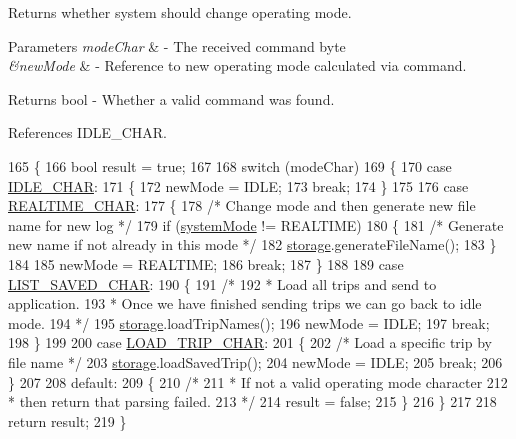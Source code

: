 Returns whether system should change operating mode. 


\begin{DoxyParams}{Parameters}
{\em mode\+Char} & -\/ The received command byte \\
\hline
{\em \&new\+Mode} & -\/ Reference to new operating mode calculated via command. \\
\hline
\end{DoxyParams}
\begin{DoxyReturn}{Returns}
bool -\/ Whether a valid command was found. 
\end{DoxyReturn}


References I\+D\+L\+E\+\_\+\+C\+H\+AR.


\begin{DoxyCode}
165 \{
166   \textcolor{keywordtype}{bool} result = \textcolor{keyword}{true};
167 
168   \textcolor{keywordflow}{switch} (modeChar)
169   \{
170     \textcolor{keywordflow}{case} \hyperlink{logging-device_8ino_ad7f0721d7856c100a69be7fa82e2865b}{IDLE\_CHAR}:
171     \{
172       newMode = IDLE;
173       \textcolor{keywordflow}{break};
174     \}
175 
176     \textcolor{keywordflow}{case} \hyperlink{logging-device_8ino_a911a5839eebf5e3d5927f4f77e9bfb62}{REALTIME\_CHAR}:
177     \{
178       \textcolor{comment}{/* Change mode and then generate new file name for new log */}
179       \textcolor{keywordflow}{if} (\hyperlink{logging-device_8ino_a13a2ecbcf455940dd240e54e9e39cf7a}{systemMode} != REALTIME)
180       \{
181         \textcolor{comment}{/* Generate new name if not already in this mode */}
182         \hyperlink{logging-device_8ino_a40059244119c00baa1b841119cfd1b2e}{storage}.generateFileName();
183       \}
184 
185       newMode = REALTIME;
186       \textcolor{keywordflow}{break};
187     \}
188 
189     \textcolor{keywordflow}{case} \hyperlink{logging-device_8ino_a4ffb22b7b0017657087830d24f68a323}{LIST\_SAVED\_CHAR}:
190     \{
191       \textcolor{comment}{/*}
192 \textcolor{comment}{       * Load all trips and send to application.}
193 \textcolor{comment}{       * Once we have finished sending trips we can go back to idle mode.}
194 \textcolor{comment}{       */}
195       \hyperlink{logging-device_8ino_a40059244119c00baa1b841119cfd1b2e}{storage}.loadTripNames();
196       newMode = IDLE;
197       \textcolor{keywordflow}{break};
198     \}
199 
200     \textcolor{keywordflow}{case} \hyperlink{logging-device_8ino_aa72e33a6bcfedf9118f573741b4e137b}{LOAD\_TRIP\_CHAR}:
201     \{
202       \textcolor{comment}{/* Load a specific trip by file name */}
203       \hyperlink{logging-device_8ino_a40059244119c00baa1b841119cfd1b2e}{storage}.loadSavedTrip();
204       newMode = IDLE;
205       \textcolor{keywordflow}{break};
206     \}
207 
208     \textcolor{keywordflow}{default}:
209     \{
210       \textcolor{comment}{/*}
211 \textcolor{comment}{       * If not a valid operating mode character}
212 \textcolor{comment}{       * then return that parsing failed.}
213 \textcolor{comment}{       */}
214       result = \textcolor{keyword}{false};
215     \}
216   \}
217 
218   \textcolor{keywordflow}{return} result;
219 \}
\end{DoxyCode}
